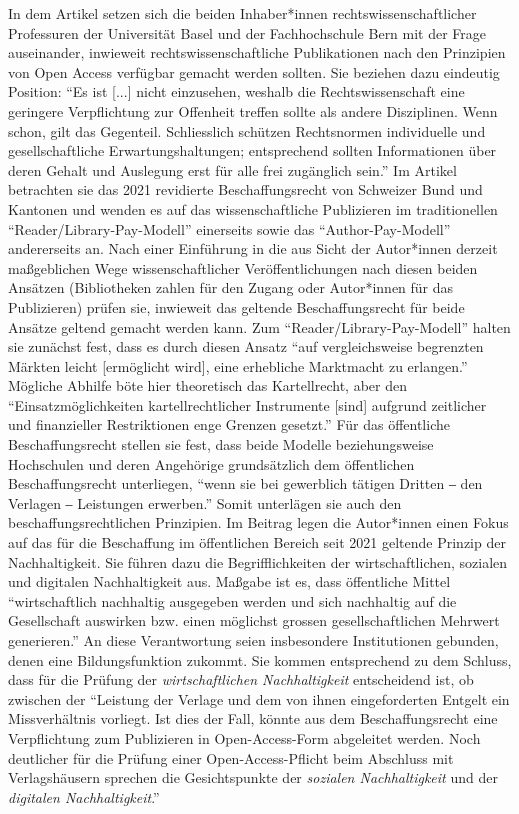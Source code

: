 \documentclass[a4paper,
fontsize=11pt,
oneside,
numbers=noperiodatend,
parskip=half-,
bibliography=totoc,
final
]{scrartcl}
\begin{document}
In dem Artikel setzen sich die beiden Inhaber*innen
rechtswissenschaftlicher Professuren der Universität Basel und der
Fachhochschule Bern mit der Frage auseinander, inwieweit
rechtswissenschaftliche Publikationen nach den Prinzipien von Open
Access verfügbar gemacht werden sollten. Sie beziehen dazu eindeutig
Position: \enquote{Es ist {[}...{]} nicht einzusehen, weshalb die
Rechtswissenschaft eine geringere Verpflichtung zur Offenheit treffen
sollte als andere Disziplinen. Wenn schon, gilt das Gegenteil.
Schliesslich schützen Rechtsnormen individuelle und gesellschaftliche
Erwartungshaltungen; entsprechend sollten Informationen über deren
Gehalt und Auslegung erst für alle frei zugänglich sein.} Im Artikel
betrachten sie das 2021 revidierte Beschaffungsrecht von Schweizer Bund
und Kantonen und wenden es auf das wissenschaftliche Publizieren im
traditionellen \enquote{Reader/Library-Pay-Modell} einerseits sowie das
\enquote{Author-Pay-Modell} andererseits an. Nach einer Einführung in
die aus Sicht der Autor*innen derzeit maßgeblichen Wege
wissenschaftlicher Veröffentlichungen nach diesen beiden Ansätzen
(Bibliotheken zahlen für den Zugang oder Autor*innen für das
Publizieren) prüfen sie, inwieweit das geltende Beschaffungsrecht für
beide Ansätze geltend gemacht werden kann. Zum
\enquote{Reader/Library-Pay-Modell} halten sie zunächst fest, dass es
durch diesen Ansatz \enquote{auf vergleichsweise begrenzten Märkten
leicht {[}ermöglicht wird{]}, eine erhebliche Marktmacht zu erlangen.}
Mögliche Abhilfe böte hier theoretisch das Kartellrecht, aber den
\enquote{Einsatzmöglichkeiten kartellrechtlicher Instrumente {[}sind{]}
aufgrund zeitlicher und finanzieller Restriktionen enge Grenzen
gesetzt.} Für das öffentliche Beschaffungsrecht stellen sie fest, dass
beide Modelle beziehungsweise Hochschulen und deren Angehörige
grundsätzlich dem öffentlichen Beschaffungsrecht unterliegen,
\enquote{wenn sie bei gewerblich tätigen Dritten ‒ den Verlagen ‒
Leistungen erwerben.} Somit unterlägen sie auch den
beschaffungsrechtlichen Prinzipien. Im Beitrag legen die Autor*innen
einen Fokus auf das für die Beschaffung im öffentlichen Bereich seit
2021 geltende Prinzip der Nachhaltigkeit. Sie führen dazu die
Begrifflichkeiten der wirtschaftlichen, sozialen und digitalen
Nachhaltigkeit aus. Maßgabe ist es, dass öffentliche Mittel
\enquote{wirtschaftlich nachhaltig ausgegeben werden und sich nachhaltig
auf die Gesellschaft auswirken bzw. einen möglichst grossen
gesellschaftlichen Mehrwert generieren.} An diese Verantwortung seien
insbesondere Institutionen gebunden, denen eine Bildungsfunktion
zukommt. Sie kommen entsprechend zu dem Schluss, dass für die Prüfung
der \emph{wirtschaftlichen Nachhaltigkeit} entscheidend ist, ob zwischen
der \enquote{Leistung der Verlage und dem von ihnen eingeforderten
Entgelt ein Missverhältnis vorliegt. Ist dies der Fall, könnte aus dem
Beschaffungsrecht eine Verpflichtung zum Publizieren in Open-Access-Form
abgeleitet werden. Noch deutlicher für die Prüfung einer
Open-Access-Pflicht beim Abschluss mit Verlagshäusern sprechen die
Gesichtspunkte der \emph{sozialen Nachhaltigkeit} und der
\emph{digitalen Nachhaltigkeit}.}
\end{document}
